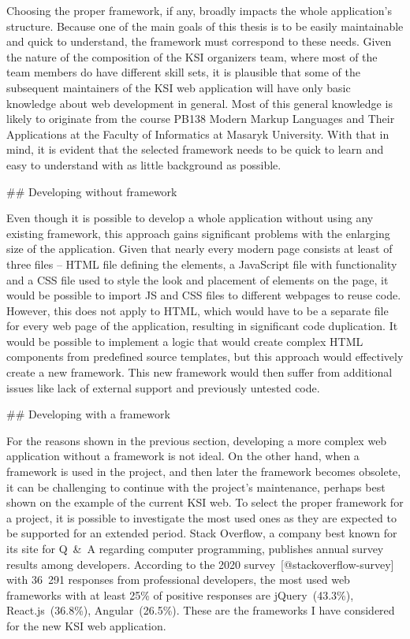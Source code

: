 \documentclass[
  digital, %
  oneside, %
  lof,     %
  nolot,     %
]{fithesis4}
\begin{document}
Choosing the proper framework, if any, broadly impacts the whole application's structure. Because one of the main goals of this thesis is to be easily maintainable and quick to understand, the framework must correspond to these needs. Given the nature of the composition of the \acrshort{KSI} organizers team, where most of the team members do have different skill sets, it is plausible that some of the subsequent maintainers of the \acrshort{KSI} web application will have only basic knowledge about web development in general. Most of this general knowledge is likely to originate from the course PB138 Modern Markup Languages and Their Applications at the Faculty of Informatics at Masaryk University. With that in mind, it is evident that the selected framework needs to be quick to learn and easy to understand with as little background as possible.

## Developing without framework

Even though it is possible to develop a whole application without using any existing framework, this approach gains significant problems with the enlarging size of the application. Given that nearly every modern page consists at least of three files -- HTML file defining the elements, a JavaScript file with functionality and a \acrshort{CSS} file used to style the look and placement of elements on the page, it would be possible to import JS and \acrshort{CSS} files to different webpages to reuse code. However, this does not apply to HTML, which would have to be a separate file for every web page of the application, resulting in significant code duplication. It would be possible to implement a logic that would create complex HTML components from predefined source templates, but this approach would effectively create a new framework. This new framework would then suffer from additional issues like lack of external support and previously untested code.

## Developing with a framework

For the reasons shown in the previous section, developing a more complex web application without a framework is not ideal. On the other hand, when a framework is used in the project, and then later the framework becomes obsolete, it can be challenging to continue with the project's maintenance, perhaps best shown on the example of the current \acrshort{KSI} web. To select the proper framework for a project, it is possible to investigate the most used ones as they are expected to be supported for an extended period. Stack Overflow, a company best known for its site for Q~\&~A regarding computer programming, publishes annual survey results among developers. According to the 2020 survey~[@stackoverflow-survey] with 36~291 responses from professional developers, the most used web frameworks with at least 25\% of positive responses are jQuery~(43.3\%), React.js~(36.8\%), Angular~(26.5\%). These are the frameworks I have considered for the new \acrshort{KSI} web application.
\end{document}
